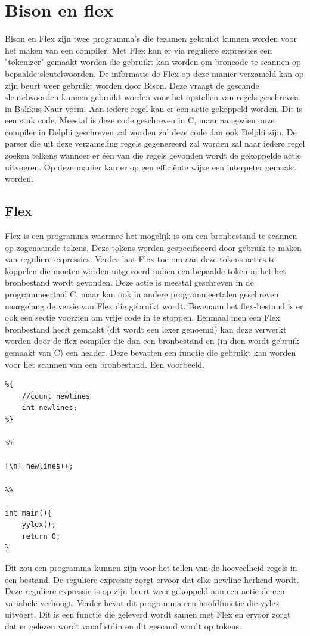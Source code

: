 \documentclass[11pt,a4paper]{article}
\begin{document}
\section{Bison en flex}
Bison en Flex zijn twee programma's die tezamen gebruikt kunnen worden voor het maken van een compiler. Met Flex kan er via reguliere expressies een "tokenizer" gemaakt worden die gebruikt kan worden om broncode te scannen op bepaalde sleutelwoorden. De informatie de Flex op deze manier verzameld kan op zijn beurt weer gebruikt worden door Bison. Deze vraagt de gescande sleutelwoorden kunnen gebruikt worden voor het opstellen van regels geschreven in Bakkus-Naur vorm. Aan iedere regel kan er een actie gekoppeld worden. Dit is een stuk code. Meestal is deze code geschreven in C, maar aangezien onze compiler in Delphi geschreven zal worden zal deze code dan ook Delphi zijn. De parser die uit deze verzameling regels gegenereerd zal worden zal naar iedere regel zoeken telkens wanneer er één van die regels gevonden wordt de gekoppelde actie uitvoeren. Op deze manier kan er op een efficiënte wijze een interpeter gemaakt worden.

\subsection{Flex}
Flex is een programma waarmee het mogelijk is om een bronbestand te scannen op zogenaamde tokens. Deze tokens worden gespecificeerd door gebruik te maken van reguliere expressies. Verder laat Flex toe om aan deze tokens acties te koppelen die moeten worden uitgevoerd indien een bepaalde token in het het bronbestand wordt gevonden. Deze actie is meestal geschreven in de programmeertaal C, maar kan ook in andere programmeertalen geschreven naargelang de versie van Flex die gebruikt wordt. Bovenaan het flex-bestand is er ook een sectie voorzien om vrije code in te stoppen. Eenmaal men een Flex bronbestand heeft gemaakt (dit wordt een lexer genoemd) kan deze verwerkt worden door de flex compiler die dan een bronbestand en (in dien wordt gebruik gemaakt van C) een header. Deze bevatten een functie die gebruikt kan worden voor het scannen van een bronbestand. Een voorbeeld.
\begin{verbatim}
%{
	//count newlines
	int newlines;
%}

%%

[\n] newlines++;

%%

int main(){
	yylex();
	return 0;
}
\end{verbatim}  
Dit zou een programma kunnen  zijn voor het tellen van de hoeveelheid regels in een bestand. De reguliere expressie zorgt ervoor dat elke newline herkend wordt. Deze reguliere expressie is op zijn beurt weer gekoppeld aan een actie de een variabele verhoogt. Verder bevat dit programma een hoofdfunctie die yylex uitvoert. Dit is een functie die geleverd wordt samen met Flex en ervoor zorgt dat er gelezen wordt vanaf stdin en dit gescand wordt op tokens.
\end{document}
